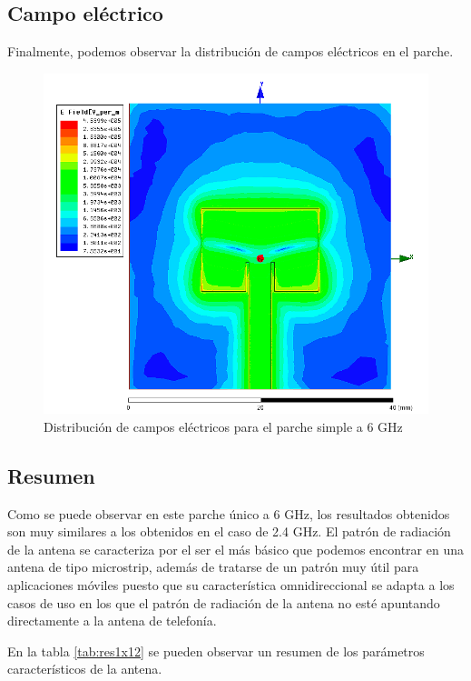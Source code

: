 \newpage
\subsection{Campo eléctrico}
\par Finalmente, podemos observar la distribución de campos eléctricos en el parche. 

\begin{figure}[H]
    \centering
        \includegraphics[width=\textwidth]{archivos/analisis/1x12/8}
        \caption{Distribución de campos eléctricos para el parche simple a 6 GHz}
        \label{fig:elec1x12}
\end{figure}


\subsection{Resumen}
\par Como se puede observar en este parche único a 6 GHz, los resultados obtenidos son muy similares a los obtenidos en el caso de 2.4 GHz. El patrón de radiación de la antena se caracteriza por el ser el más básico que podemos encontrar en una antena de tipo microstrip, además de tratarse de un patrón muy útil para aplicaciones móviles puesto que su característica omnidireccional se adapta a los casos de uso en los que el patrón de radiación de la antena no esté apuntando directamente a la antena de telefonía. 
\\
\par En la tabla \ref{tab:res1x12} se pueden observar un resumen de los parámetros característicos de la antena. 

